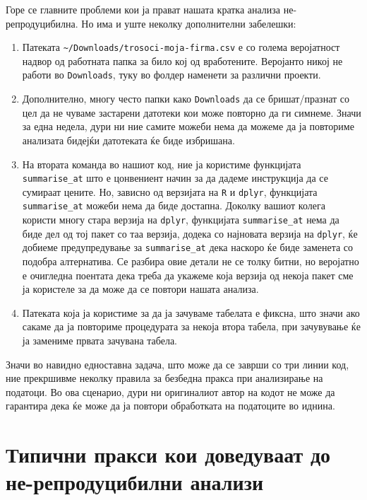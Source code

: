 \documentclass[
]{book}
\begin{document}
Горе се главните проблеми кои ја прават нашата кратка анализа не-репродуцибилна. Но има и уште неколку дополнителни забелешки:

\begin{enumerate}
\def\labelenumi{\arabic{enumi}.}
\setcounter{enumi}{3}
\item
  Патеката \texttt{\textasciitilde{}/Downloads/trosoci-moja-firma.csv} е со голема веројатност надвор од работната папка за било кој од вработените. Веројанто никој не работи во \texttt{Downloads}, туку во фолдер наменети за различни проекти.
\item
  Дополнително, многу често папки како \texttt{Downloads} да се бришат/празнат со цел да не чуваме застарени датотеки кои може повторно да ги симнеме. Значи за една недела, дури ни ние самите можеби нема да можеме да ја повториме анализата бидејќи датотеката ќе биде избришана.
\item
  На втората команда во нашиот код, ние ја користиме функцијата \texttt{summarise\_at} што е цонвениент начин за да дадеме инструкција да се сумираат цените. Но, зависно од верзијата на \texttt{R} и \texttt{dplyr}, функцијата \texttt{summarise\_at} можеби нема да биде достапна. Доколку вашиот колега користи многу стара верзија на \texttt{dplyr}, функцијата \texttt{summarise\_at} нема да биде дел од тој пакет со таа верзија, додека со најновата верзија на \texttt{dplyr}, ќе добиеме предупредување за \texttt{summarise\_at} дека наскоро ќе биде заменета со подобра алтернатива. Се разбира овие детали не се толку битни, но веројатно е очигледна поентата дека треба да укажеме која верзија од некоја пакет сме ја користеле за да може да се повтори нашата анализа.
\item
  Патеката која ја користиме за да ја зачуваме табелата е фиксна, што значи ако сакаме да ја повториме процедурата за некоја втора табела, при зачувување ќе ја замениме првата зачувана табела.
\end{enumerate}

Значи во навидно едноставна задача, што може да се заврши со три линии код, ние прекршивме неколку правила за безбедна пракса при анализирање на податоци. Во ова сценарио, дури ни оригиналиот автор на кодот не може да гарантира дека ќе може да ја повтори обработката на податоците во иднина.

\hypertarget{indicators}{%
\section{Типични пракси кои доведуваат до не-репродуцибилни анализи}\label{indicators}}
\end{document}
